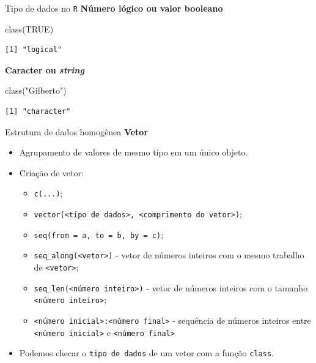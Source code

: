 \documentclass[
  10pt,
  ignorenonframetext,
]{beamer}
\newenvironment{Shaded}{\begin{snugshade}}{\end{snugshade}}
\newcommand{\ConstantTok}[1]{\textcolor[rgb]{0.56,0.35,0.01}{#1}}
\newcommand{\FunctionTok}[1]{\textcolor[rgb]{0.28,0.35,0.67}{#1}}
\newcommand{\NormalTok}[1]{\textcolor[rgb]{0.00,0.23,0.31}{#1}}
\newcommand{\StringTok}[1]{\textcolor[rgb]{0.13,0.47,0.30}{#1}}
\providecommand{\tightlist}{%
  \setlength{\itemsep}{0pt}\setlength{\parskip}{0pt}}\usepackage{longtable,booktabs,array}
\begin{document}
\begin{frame}[fragile]{Tipo de dados no \texttt{R}}
\protect\hypertarget{tipo-de-dados-no-r-1}{}
\textbf{Número lógico ou valor booleano}

\begin{Shaded}
\begin{Highlighting}[]
\FunctionTok{class}\NormalTok{(}\ConstantTok{TRUE}\NormalTok{)}
\end{Highlighting}
\end{Shaded}

\begin{verbatim}
[1] "logical"
\end{verbatim}

\textbf{Caracter ou \emph{string}}

\begin{Shaded}
\begin{Highlighting}[]
\FunctionTok{class}\NormalTok{(}\StringTok{"Gilberto"}\NormalTok{)}
\end{Highlighting}
\end{Shaded}

\begin{verbatim}
[1] "character"
\end{verbatim}
\end{frame}

\begin{frame}[fragile]{Estrutura de dados homogênea}
\protect\hypertarget{estrutura-de-dados-homoguxeanea}{}
\textbf{Vetor}

\begin{itemize}
\tightlist
\item
  Agrupamento de valores de mesmo tipo em um único objeto.
\item
  Criação de vetor:

  \begin{itemize}
  \tightlist
  \item
    \texttt{c(...)};
  \item
    \texttt{vector(\textquotesingle{}\textless{}tipo\ de\ dados\textgreater{}\textquotesingle{},\ \textless{}comprimento\ do\ vetor\textgreater{})};
  \item
    \texttt{seq(from\ =\ a,\ to\ =\ b,\ by\ =\ c)};
  \item
    \texttt{seq\_along(\textless{}vetor\textgreater{})} - vetor de
    números inteiros com o mesmo trabalho de
    \texttt{\textless{}vetor\textgreater{}};
  \item
    \texttt{seq\_len(\textless{}número\ inteiro\textgreater{})} - vetor
    de números inteiros com o tamanho
    \texttt{\textless{}número\ inteiro\textgreater{}};
  \item
    \texttt{\textless{}número\ inicial\textgreater{}:\textless{}número\ final\textgreater{}}
    - sequência de números inteiros entre
    \texttt{\textless{}número\ inicial\textgreater{}} e
    \texttt{\textless{}número\ final\textgreater{}}
  \end{itemize}
\item
  Podemos checar o \texttt{tipo\ de\ dados} de um vetor com a função
  \texttt{class}.
\end{itemize}
\end{frame}
\end{document}
